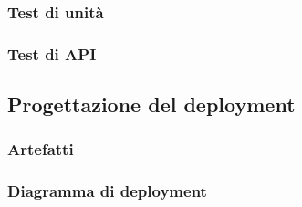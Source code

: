\documentclass{article}
\begin{document}
\subsubsection{Test di unità}

\subsubsection{Test di API}


\subsection{Progettazione del deployment}
\subsubsection{Artefatti}

\subsubsection{Diagramma di deployment}

\end{document}
